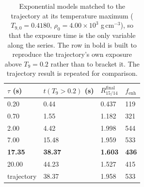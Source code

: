 \begin{table}[h!]
\centering
\caption{Exponential models matched to the trajectory at its temperature maximum ($T_{9,0} = 0.4180$, $\rho_0 = 4.00\times10^{3}$ g\,cm$^{-3}$), so that the exposure time is the only variable along the series. The row in bold is built to reproduce the trajectory's own exposure above $T_9 = 0.2$ rather than to bracket it. The trajectory result is repeated for comparison.}
\begin{tabular}{llll}
\hline
$\tau$ (s) & $t(T_9 > 0.2)$ (s) & $R^{\mathrm{final}}_{15/14}$ & $f_{\mathrm{enh}}$ \\
\hline
0.20 & 0.44 & 0.437 & 119 \\
0.70 & 1.55 & 1.182 & 321 \\
2.00 & 4.42 & 1.998 & 544 \\
7.00 & 15.48 & 1.959 & 533 \\
\textbf{17.35} & \textbf{38.37} & \textbf{1.603} & \textbf{436} \\
20.00 & 44.23 & 1.527 & 415 \\
\hline
trajectory & 38.37 & 1.958 & 533 \\
\hline
\end{tabular}
\label{tab:nucnetpy_matched_control}
\end{table}
